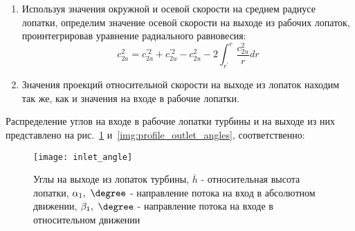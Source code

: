 \begin{enumerate}
	\item Используя значения окружной и осевой скорости на среднем радиусе лопатки, определим значение осевой скорости на выходе из рабочих лопаток, проинтегрировав уравнение радиального равновесия:
		$$
			c_{2a}^2 = c_{2a}^{\prime 2} + c_{2u}^{\prime 2} - c_{2u}^{2} - 2 \int_{r^\prime}^r \frac{c_{2u}^2}{r} dr
		$$
%

	\item Значения проекций относительной скорости на выходе из лопаток находим так же, как и значения на входе в рабочие лопатки.


\end{enumerate}
Распределение углов на входе в рабочие лопатки турбины и на выходе из них представлено на рис.~\ref{img:profile_inlet_angles}
и~\ref{img:profile_outlet_angles}, соответственно:
	\begin{figure}[H]
		\centering
		\texttt{[image: inlet\_angle]}
		\caption{
		Углы на выходе из лопаток турбины,
			$\overline{h}$ - относительная высота лопатки,
			$\alpha_1, \ \degree$ - направление потока на вход в абсолютном движении,
			$\beta_1, \ \degree$ - направление потока на входе в относительном движении
		}
		\label{img:profile_inlet_angles}
	\end{figure}

